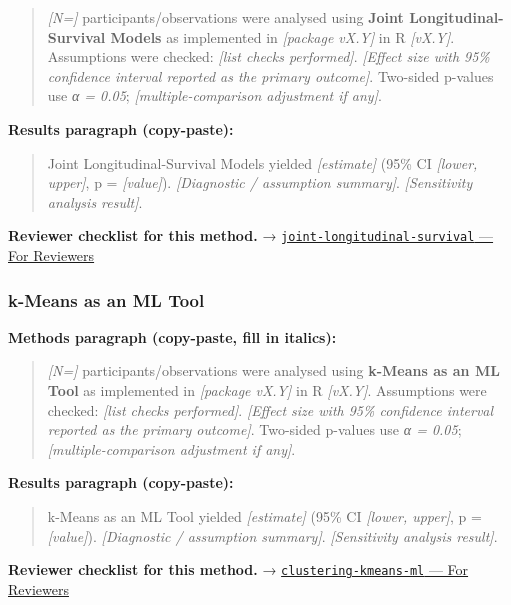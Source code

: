 \documentclass[
]{article}
\begin{document}
\begin{quote}
\emph{{[}N={]}} participants/observations were analysed using
\textbf{Joint Longitudinal-Survival Models} as implemented in
\emph{{[}package vX.Y{]}} in R \emph{{[}vX.Y{]}}. Assumptions were
checked: \emph{{[}list checks performed{]}}. \emph{{[}Effect size with
95\% confidence interval reported as the primary outcome{]}}. Two-sided
p-values use \emph{α = 0.05}; \emph{{[}multiple-comparison adjustment if
any{]}}.
\end{quote}

\textbf{Results paragraph (copy-paste):}

\begin{quote}
Joint Longitudinal-Survival Models yielded \emph{{[}estimate{]}} (95\%
CI \emph{{[}lower, upper{]}}, p = \emph{{[}value{]}}).
\emph{{[}Diagnostic / assumption summary{]}}. \emph{{[}Sensitivity
analysis result{]}}.
\end{quote}

\textbf{Reviewer checklist for this method.} →
\href{../chapters/11-survival/joint-longitudinal-survival.Rmd\#for-reviewers}{\texttt{joint-longitudinal-survival}
--- For Reviewers}

\subsubsection{k-Means as an ML Tool}\label{k-means-as-an-ml-tool}

\textbf{Methods paragraph (copy-paste, fill in italics):}

\begin{quote}
\emph{{[}N={]}} participants/observations were analysed using
\textbf{k-Means as an ML Tool} as implemented in \emph{{[}package
vX.Y{]}} in R \emph{{[}vX.Y{]}}. Assumptions were checked: \emph{{[}list
checks performed{]}}. \emph{{[}Effect size with 95\% confidence interval
reported as the primary outcome{]}}. Two-sided p-values use \emph{α =
0.05}; \emph{{[}multiple-comparison adjustment if any{]}}.
\end{quote}

\textbf{Results paragraph (copy-paste):}

\begin{quote}
k-Means as an ML Tool yielded \emph{{[}estimate{]}} (95\% CI
\emph{{[}lower, upper{]}}, p = \emph{{[}value{]}}). \emph{{[}Diagnostic
/ assumption summary{]}}. \emph{{[}Sensitivity analysis result{]}}.
\end{quote}

\textbf{Reviewer checklist for this method.} →
\href{../chapters/13-ml/clustering-kmeans-ml.Rmd\#for-reviewers}{\texttt{clustering-kmeans-ml}
--- For Reviewers}
\end{document}
